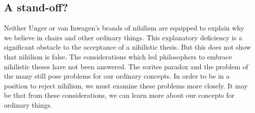 \documentclass[11pt]{standalone}
\begin{document}
\begin{spacing}{1.5}
\section{A stand-off?}
Neither Unger or van Inwagen's brands of nihilism are equipped to
explain why we believe in chairs and other ordinary things.  This
explanatory deficiency is a significant obstacle to the acceptance of
a nihilistic thesis.  But this does not show that nihilism is false.
The considerations which led philosophers to embrace nihilistic theses
have not been answered.  The sorites paradox and the problem of the
many still pose problems for our ordinary concepts.  In order to be in
a position to reject nihilism, we must examine these problems more
closely.  It may be that from these considerations, we can learn more
about our concepts for ordinary things.

\ifstandalone
\end{spacing}
\fi
\end{document}

